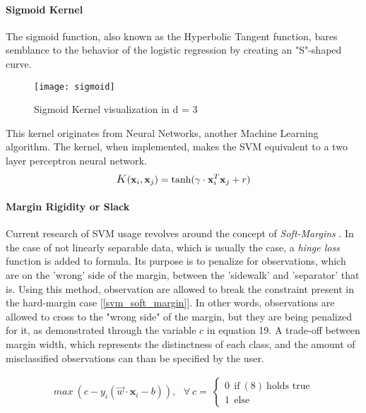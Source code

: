 \paragraph{Sigmoid Kernel}
	The sigmoid function, also known as the Hyperbolic Tangent function, bares semblance to the behavior of the logistic regression by creating an "S"-shaped curve. 
	
	\begin{figure}[h]
		\centering
		\captionsetup{width=0.8\textwidth}
		\texttt{[image: sigmoid]}
		\caption[Sigmoid Kernel]{
			\footnotesize{
				Sigmoid Kernel visualization in d = 3
			}
		}
	\end{figure}
	
	This kernel originates from Neural Networks, another Machine Learning algorithm. The kernel, when implemented, makes the SVM equivalent to a two layer perceptron neural network.
	\begin{equation}
		\mathlarger{K}(\textbf{x}_i,\textbf{x}_j) = \text{tanh}(\gamma \cdot \textbf{x}^T_i \textbf{x}_j + r)
	\end{equation}
	


\paragraph{Margin Rigidity or Slack}
	Current research of SVM usage revolves around the concept of \textit{Soft-Margins} \cite{SVM_cortes1995support}. In the case of not linearly separable data, which is usually the case, a \textit{hinge loss} function is added to formula. Its purpose is to penalize for observations, which are on the 'wrong' side of the margin, between the 'sidewalk' and 'separator' that is. Using this method, observation are allowed to break the constraint present in the hard-margin case [\ref{svm_soft_margin}]. In other words, observations are allowed to cross to the "wrong side" of the margin, but they are being penalized for it, as demonstrated through the variable $c$ in equation 19. A trade-off between margin width, which represents the distinctness of each class, and the amount of misclassified observations can than be specified by the user.

	\begin{equation}
		\begin{aligned}
			max \ (c - y_i(\vec{w} \cdot \textbf{x}_i - b)), 
			\  \ \ \forall \ c = \ 
			\begin{cases} 
				0 \ \ \text{if} \ (8) \ \text{holds true}\\
				1 \ \ \text{else}
			\end{cases}
		\end{aligned}
		\label{svm_soft_margin}
	\end{equation}

